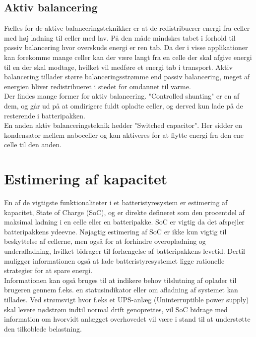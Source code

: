 \subsection{Aktiv balancering}
Fælles for de aktive balanceringsteknikker er at de redistribuerer energi fra celler med høj ladning til celler med lav. På den måde mindskes tabet i forhold til passiv balancering hvor overskuds energi er ren tab. Da der i visse applikationer kan forekomme mange celler kan der være langt fra en celle der skal afgive energi til en der skal modtage, hvilket vil medføre et energi tab i transport. Aktiv balancering tillader større balanceringsstrømme end passiv balancering, meget af energien bliver redistribueret i stedet for omdannet til varme.
\\

Der findes mange former for aktiv balancering. "Controlled shunting" er en af dem, og går ud på at omdirigere fuldt opladte celler, og derved kun lade på de resterende i batteripakken.
\\

En anden aktiv balanceringsteknik hedder "Switched capacitor". Her sidder en kondensator mellem naboceller og kan aktiveres for at flytte energi fra den ene celle til den anden.

\section{Estimering af kapacitet}
En af de vigtigste funktionaliteter i et batteristyresystem er estimering af kapacitet, State of Charge (SoC), og er direkte defineret som den procentdel af maksimal ladning i en celle eller en batteripakke. SoC er vigtig da det afspejler batteripakkens ydeevne. Nøjagtig estimering af SoC er ikke kun vigtig til beskyttelse af cellerne, men også for at forhindre overopladning og underafladning, hvilket bidrager til forlængelse af batteripakkens levetid. Dertil muliggør informationen også at lade batteristyresystemet ligge rationelle strategier for at spare energi. \\

Informationen kan også bruges til at indikere behov tilslutning af oplader til brugeren gennem f.eks. en statusindikator eller om afladning af systemet kan tillades. 
Ved strømsvigt hvor f.eks et UPS-anlæg (Uninterruptible power supply) skal levere nødstrøm indtil normal drift genoprettes, vil SoC bidrage med information om hvorvidt anlægget overhovedet vil være i stand til at understøtte den tilkoblede belastning. \\


